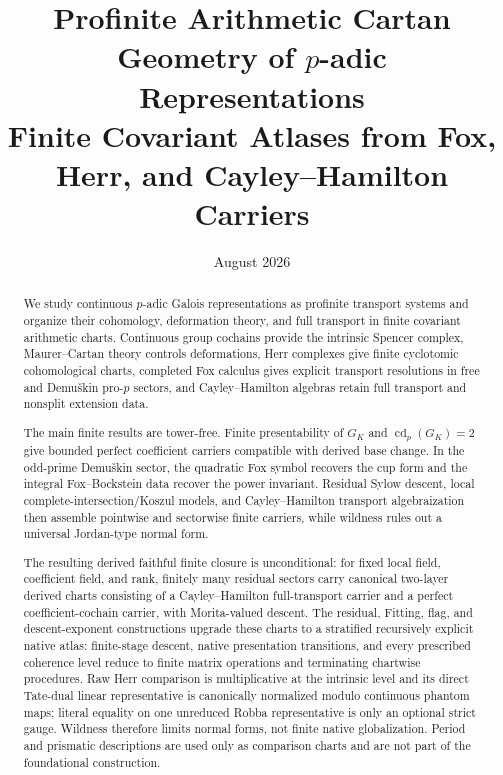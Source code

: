 \documentclass[11pt]{article}
\title{\textbf{Profinite Arithmetic Cartan Geometry of $p$-adic Representations}\\[3pt]
\large Finite Covariant Atlases from Fox, Herr, and Cayley--Hamilton Carriers}
\author{}
\date{August 2026}
\theoremstyle{definition}
\begin{document}
\maketitle

\begin{abstract}
We study continuous $p$-adic Galois representations as profinite transport systems and organize their cohomology, deformation theory, and full transport in finite covariant arithmetic charts.  Continuous group cochains provide the intrinsic Spencer complex, Maurer--Cartan theory controls deformations, Herr complexes give finite cyclotomic cohomological charts, completed Fox calculus gives explicit transport resolutions in free and Demu\v{s}kin pro-$p$ sectors, and Cayley--Hamilton algebras retain full transport and nonsplit extension data.

The main finite results are tower-free.  Finite presentability of $G_K$ and $\operatorname{cd}_p(G_K)=2$ give bounded perfect coefficient carriers compatible with derived base change.  In the odd-prime Demu\v{s}kin sector, the quadratic Fox symbol recovers the cup form and the integral Fox--Bockstein data recover the power invariant.  Residual Sylow descent, local complete-intersection/Koszul models, and Cayley--Hamilton transport algebraization then assemble pointwise and sectorwise finite carriers, while wildness rules out a universal Jordan-type normal form.

The resulting derived faithful finite closure is unconditional: for fixed local field, coefficient field, and rank, finitely many residual sectors carry canonical two-layer derived charts consisting of a Cayley--Hamilton full-transport carrier and a perfect coefficient-cochain carrier, with Morita-valued descent.  The residual, Fitting, flag, and descent-exponent constructions upgrade these charts to a stratified recursively explicit native atlas: finite-stage descent, native presentation transitions, and every prescribed coherence level reduce to finite matrix operations and terminating chartwise procedures.  Raw Herr comparison is multiplicative at the intrinsic level and its direct Tate-dual linear representative is canonically normalized modulo continuous phantom maps; literal equality on one unreduced Robba representative is only an optional strict gauge.  Wildness therefore limits normal forms, not finite native globalization.  Period and prismatic descriptions are used only as comparison charts and are not part of the foundational construction.
\end{abstract}
\end{document}
